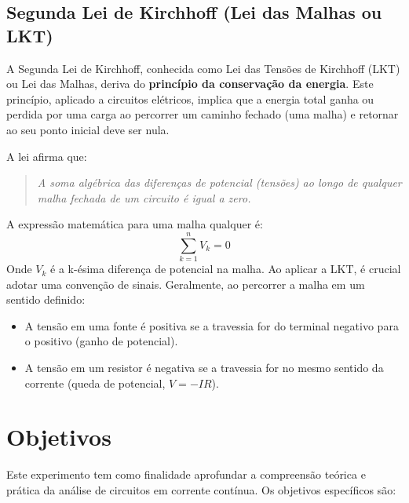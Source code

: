 \documentclass[a4paper, 12pt]{article}
\begin{document}
\subsection{Segunda Lei de Kirchhoff (Lei das Malhas ou LKT)}
A Segunda Lei de Kirchhoff, conhecida como Lei das Tensões de Kirchhoff (LKT) ou Lei das Malhas, deriva do \textbf{princípio da conservação da energia}. Este princípio, aplicado a circuitos elétricos, implica que a energia total ganha ou perdida por uma carga ao percorrer um caminho fechado (uma malha) e retornar ao seu ponto inicial deve ser nula.

A lei afirma que:
\begin{quote}
\textit{A soma algébrica das diferenças de potencial (tensões) ao longo de qualquer malha fechada de um circuito é igual a zero.}
\end{quote}
A expressão matemática para uma malha qualquer é:
\begin{equation}
\sum_{k=1}^{n} V_k = 0
\label{eq:lkt}
\end{equation}
Onde $V_k$ é a k-ésima diferença de potencial na malha. Ao aplicar a LKT, é crucial adotar uma convenção de sinais. Geralmente, ao percorrer a malha em um sentido definido:
\begin{itemize}
\item A tensão em uma fonte é positiva se a travessia for do terminal negativo para o positivo (ganho de potencial).
\item A tensão em um resistor é negativa se a travessia for no mesmo sentido da corrente (queda de potencial, $V = -IR$).
\end{itemize}

\section{Objetivos}

Este experimento tem como finalidade aprofundar a compreensão teórica e prática da análise de circuitos em corrente contínua. Os objetivos específicos são:
\end{document}
